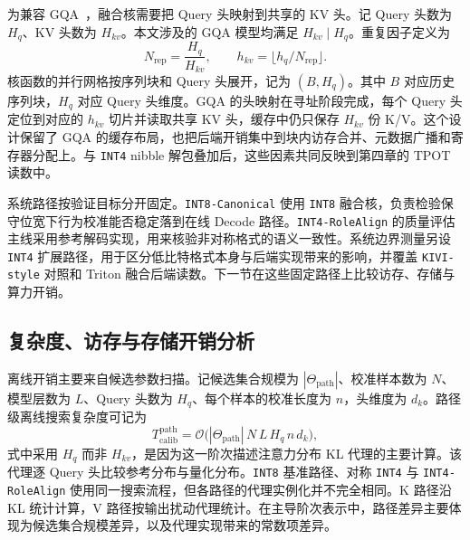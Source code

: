为兼容 GQA~\cite{ainslie2023gqa}，融合核需要把 Query 头映射到共享的 KV 头。记 Query 头数为 $H_q$、KV 头数为 $H_{kv}$。本文涉及的 GQA 模型均满足 $H_{kv}\mid H_q$。重复因子定义为
\begin{equation}
N_{\mathrm{rep}}=\frac{H_q}{H_{kv}},
\qquad
h_{kv}
=
\bigl\lfloor h_q / N_{\mathrm{rep}} \bigr\rfloor.
\end{equation}
核函数的并行网格按序列块和 Query 头展开，记为 $(B,H_q)$。其中 $B$ 对应历史序列块，$H_q$ 对应 Query 头维度。GQA 的头映射在寻址阶段完成，每个 Query 头定位到对应的 $h_{kv}$ 切片并读取共享 KV 头，缓存中仍只保存 $H_{kv}$ 份 K/V。这个设计保留了 GQA 的缓存布局，也把后端开销集中到块内访存合并、元数据广播和寄存器分配上。与 \texttt{INT4} nibble 解包叠加后，这些因素共同反映到第四章的 TPOT 读数中。

系统路径按验证目标分开固定。\texttt{INT8-Canonical} 使用 \texttt{INT8} 融合核，负责检验保守位宽下行为校准能否稳定落到在线 Decode 路径。\texttt{INT4-RoleAlign} 的质量评估主线采用参考解码实现，用来核验非对称格式的语义一致性。系统边界测量另设 \texttt{INT4} 扩展路径，用于区分低比特格式本身与后端实现带来的影响，并覆盖 \texttt{KIVI-style} 对照和 Triton 融合后端读数。下一节在这些固定路径上比较访存、存储与算力开销。


\subsection{复杂度、访存与存储开销分析}
\label{subsec:ch3-system-overhead}

离线开销主要来自候选参数扫描。记候选集合规模为 $|\Theta_{\mathrm{path}}|$、校准样本数为 $N$、模型层数为 $L$、Query 头数为 $H_q$、每个样本的校准长度为 $n$，头维度为 $d_k$。路径级离线搜索复杂度可记为
\begin{equation}
T_{\mathrm{calib}}^{\mathrm{path}}
=
\mathcal O\!\bigl(
|\Theta_{\mathrm{path}}|\,N\,L\,H_q\,n\,d_k
\bigr),
\end{equation}
式中采用 $H_q$ 而非 $H_{kv}$，是因为这一阶次描述注意力分布 KL 代理的主要计算。该代理逐 Query 头比较参考分布与量化分布。\texttt{INT8} 基准路径、对称 \texttt{INT4} 与 \texttt{INT4-RoleAlign} 使用同一搜索流程，但各路径的代理实例化并不完全相同。K 路径沿 KL 统计计算，V 路径按输出扰动代理统计。在主导阶次表示中，路径差异主要体现为候选集合规模差异，以及代理实现带来的常数项差异。

